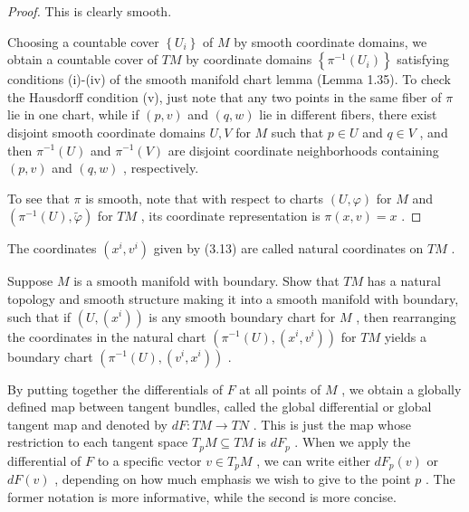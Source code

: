 \begin{proof}
This is clearly smooth.

Choosing a countable cover $\left\{  {U}_{i}\right\}$ of $M$ by smooth coordinate domains, we obtain a countable cover of ${TM}$ by coordinate domains $\left\{  {{\pi }^{-1}\left( {U}_{i}\right) }\right\}$ satisfying conditions (i)-(iv) of the smooth manifold chart lemma (Lemma 1.35). To check the Hausdorff condition (v), just note that any two points in the same fiber of $\pi$ lie in one chart, while if $\left( {p, v}\right)$ and $\left( {q, w}\right)$ lie in different fibers, there exist disjoint smooth coordinate domains $U, V$ for $M$ such that $p \in  U$ and $q \in  V$ , and then ${\pi }^{-1}\left( U\right)$ and ${\pi }^{-1}\left( V\right)$ are disjoint coordinate neighborhoods containing $\left( {p, v}\right)$ and $\left( {q, w}\right)$ , respectively.

To see that $\pi$ is smooth, note that with respect to charts $\left( {U,\varphi }\right)$ for $M$ and $\left( {{\pi }^{-1}\left( U\right) ,\widetilde{\varphi }}\right)$ for ${TM}$ , its coordinate representation is $\pi \left( {x, v}\right)  = x$ .
\end{proof}

\begin{notation}
\label{not:3-16-extra-2}
\mathlibok
The coordinates $\left( {{x}^{i},{v}^{i}}\right)$ given by (3.13) are called natural coordinates on ${TM}$ .
\end{notation}

\begin{exercise}
\label{exer:3-19}
\leanok
{}
Suppose $M$ is a smooth manifold with boundary. Show that ${TM}$ has a natural topology and smooth structure making it into a smooth manifold with boundary, such that if $\left( {U,\left( {x}^{i}\right) }\right)$ is any smooth boundary chart for $M$ , then rearranging the coordinates in the natural chart $\left( {{\pi }^{-1}\left( U\right) ,\left( {{x}^{i},{v}^{i}}\right) }\right)$ for ${TM}$ yields a boundary chart $\left( {{\pi }^{-1}\left( U\right) ,\left( {{v}^{i},{x}^{i}}\right) }\right)$ .
\end{exercise}

\begin{definition}
\label{def:3-16-extra-3}
\mathlibok
By putting together the differentials of $F$ at all points of $M$ , we obtain a globally defined map between tangent bundles, called the global differential or global tangent map and denoted by ${dF} : {TM} \rightarrow  {TN}$ . This is just the map whose restriction to each tangent space ${T}_{p}M \subseteq  {TM}$ is $d{F}_{p}$ . When we apply the differential of $F$ to a specific vector $v \in  {T}_{p}M$ , we can write either $d{F}_{p}\left( v\right)$ or ${dF}\left( v\right)$ , depending on how much emphasis we wish to give to the point $p$ . The former notation is more informative, while the second is more concise.
\end{definition}

